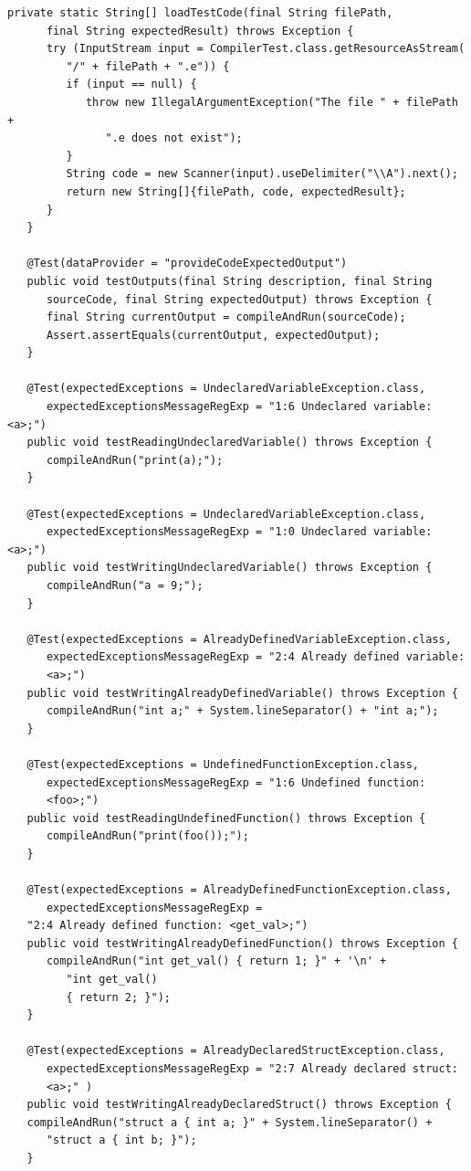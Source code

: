 \begin{lstlisting}[frame=htrbl, caption={Implementation of {\ttfamily CompilerTest.java}}, label={lst:compiler_test}, basicstyle=\footnotesize]
   private static String[] loadTestCode(final String filePath, 
      final String expectedResult) throws Exception {
      try (InputStream input = CompilerTest.class.getResourceAsStream(
         "/" + filePath + ".e")) {
         if (input == null) {
            throw new IllegalArgumentException("The file " + filePath + 
               ".e does not exist");
         }
         String code = new Scanner(input).useDelimiter("\\A").next();
         return new String[]{filePath, code, expectedResult};
      }
   }

   @Test(dataProvider = "provideCodeExpectedOutput")
   public void testOutputs(final String description, final String 
      sourceCode, final String expectedOutput) throws Exception {
      final String currentOutput = compileAndRun(sourceCode);
      Assert.assertEquals(currentOutput, expectedOutput);
   }
   
   @Test(expectedExceptions = UndeclaredVariableException.class,
      expectedExceptionsMessageRegExp = "1:6 Undeclared variable: <a>;")
   public void testReadingUndeclaredVariable() throws Exception {
      compileAndRun("print(a);");
   }
   
   @Test(expectedExceptions = UndeclaredVariableException.class,
      expectedExceptionsMessageRegExp = "1:0 Undeclared variable: <a>;")
   public void testWritingUndeclaredVariable() throws Exception {
      compileAndRun("a = 9;");
   }
   
   @Test(expectedExceptions = AlreadyDefinedVariableException.class,
      expectedExceptionsMessageRegExp = "2:4 Already defined variable: 
      <a>;")
   public void testWritingAlreadyDefinedVariable() throws Exception {
      compileAndRun("int a;" + System.lineSeparator() + "int a;");
   }
   
   @Test(expectedExceptions = UndefinedFunctionException.class,
      expectedExceptionsMessageRegExp = "1:6 Undefined function: 
      <foo>;")
   public void testReadingUndefinedFunction() throws Exception {
      compileAndRun("print(foo());");
   }
   
   @Test(expectedExceptions = AlreadyDefinedFunctionException.class,
      expectedExceptionsMessageRegExp = 
   "2:4 Already defined function: <get_val>;")
   public void testWritingAlreadyDefinedFunction() throws Exception {
      compileAndRun("int get_val() { return 1; }" + '\n' + 
         "int get_val()
         { return 2; }");
   }
   
   @Test(expectedExceptions = AlreadyDeclaredStructException.class,
      expectedExceptionsMessageRegExp = "2:7 Already declared struct: 
      <a>;" )
   public void testWritingAlreadyDeclaredStruct() throws Exception {
   compileAndRun("struct a { int a; }" + System.lineSeparator() + 
      "struct a { int b; }");
   }
   

\end{lstlisting}
